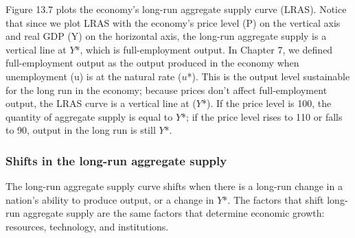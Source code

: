 \documentclass[11pt]{article} %
\begin{document}
Figure 13.7 plots the economy's long-run aggregate supply curve (LRAS). Notice that since we plot LRAS with the economy's price level (P) on the vertical axis and real GDP (Y) on the horizontal axis, the long-run aggregate supply is a vertical line at \(Y\)*, which is full-employment output. In Chapter 7, we defined full-employment output as the output produced in the economy when unemployment (u) is at the natural rate (\(u\)*). This is the output level sustainable for the long run in the economy; because prices don't affect full-employment output, the LRAS curve is a vertical line at (\(Y\)*). If the price level is 100, the quantity of aggregate supply is equal to \(Y\)*; if the price level rises to 110 or falls to 90, output in the long run is still \(Y\)*.

\subsubsection*{Shifts in the long-run aggregate supply}
The long-run aggregate supply curve shifts when there is a long-run change in a nation's ability to produce output, or a change in \(Y\)*. The factors that shift long-run aggregate supply are the same factors that determine economic growth: resources, technology, and institutions.
\end{document}
